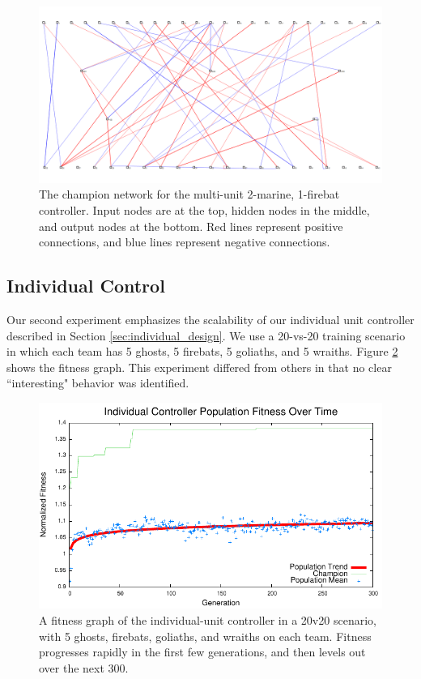 \documentclass[10pt,a4paper,twocolumn]{article}
\begin{document}
\begin{figure}
\centering
\includegraphics[scale=.3]{figures/multiunit_mf.png}
\caption{The champion network for the multi-unit 2-marine, 1-firebat controller. Input nodes are at the top, hidden nodes in the middle, and output nodes at the bottom. Red lines represent positive connections, and blue lines represent negative connections.}
\label{fig:multiunit_mf_net}
\end{figure}


\subsection{Individual Control}

Our second experiment emphasizes the scalability of our individual unit controller described in Section \ref{sec:individual_design}. We use a 20-vs-20 training scenario in which each team has 5 ghosts, 5 firebats, 5 goliaths, and 5 wraiths. Figure \ref{fig:individual_exp} shows the fitness graph. This experiment differed from others in that no clear ``interesting" behavior was identified.

\begin{figure}
\centering
\includegraphics[scale=.59]{plots/individual.pdf}
\caption{A fitness graph of the individual-unit controller in a 20v20 scenario, with 5 ghosts, firebats, goliaths, and wraiths on each team. Fitness progresses rapidly in the first few generations, and then levels out over the next 300.}
\label{fig:individual_exp}
\end{figure}
\end{document}
